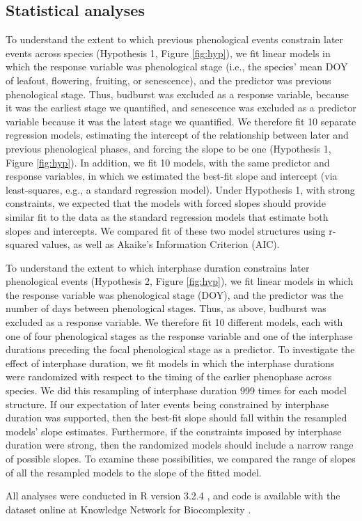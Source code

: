 \documentclass{article}
\begin{document}
\subsection*{Statistical analyses}
To understand the extent to which previous phenological events constrain later events across species (Hypothesis 1, Figure \ref{fig:hyp}), we fit linear models in which the response variable was phenological stage (i.e., the species' mean DOY of leafout, flowering, fruiting, or senescence), and the predictor was previous phenological stage. Thus, budburst was excluded as a response variable, because it was the earliest stage we quantified, and senescence was excluded as a predictor variable because it was the latest stage we quantified. We therefore fit 10 separate regression models, estimating the intercept of the relationship between later and previous phenological phases, and forcing the slope to be one (Hypothesis 1, Figure \ref{fig:hyp}). In addition, we fit 10 models, with the same predictor and response variables, in which we estimated the best-fit slope and intercept (via least-squares, e.g., a standard regression model). Under Hypothesis 1, with strong constraints, we expected that the models with forced slopes should provide similar fit to the data as the standard regression models that estimate both slopes and intercepts. We compared fit of these two model structures using r-squared values, as well as Akaike's Information Criterion (AIC). 
\par To understand the extent to which interphase duration constrains later phenological events (Hypothesis 2, Figure \ref{fig:hyp}), we fit linear models in which the response variable was phenological stage (DOY), and the predictor was the number of days between phenological stages. Thus, as above, budburst was excluded as a response variable. We therefore fit 10 different models, each with one of four phenological stages as the response variable and one of the interphase durations preceding the focal phenological stage as a predictor. To investigate the effect of interphase duration, we fit models in which the interphase durations were randomized with respect to the timing of the earlier phenophase across species. We did this resampling of interphase duration 999 times for each model structure. If our expectation of later events being constrained by interphase duration was supported, then the best-fit slope should fall within the resampled models' slope estimates. Furthermore, if the constraints imposed by interphase duration were strong, then the randomized models should include a narrow range of possible slopes. To examine these possibilities, we compared the range of slopes of all the resampled models to the slope of the fitted model. 
\par All analyses were conducted in R version 3.2.4 \citep{rcoreteam2017}, and code is available with the dataset online at Knowledge Network for Biocomplexity \citep{gee2017}.
\end{document}
